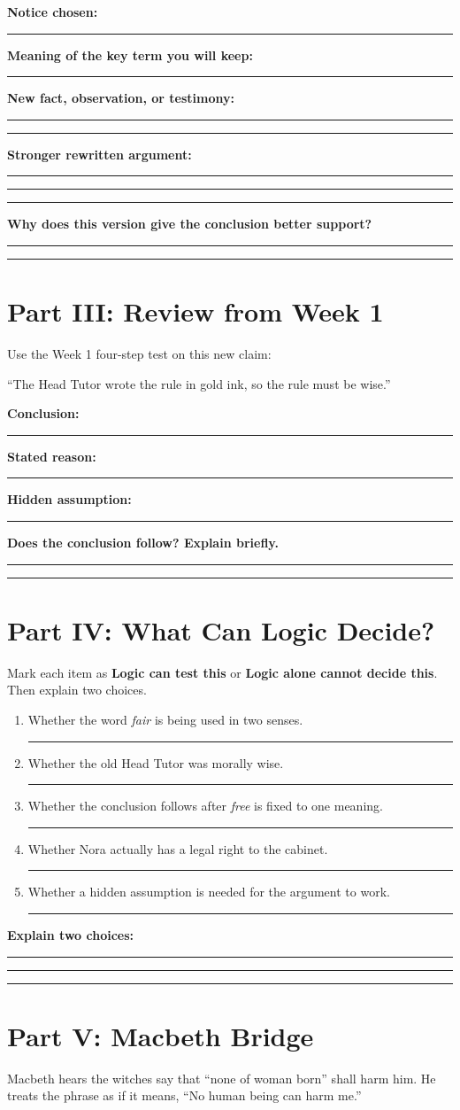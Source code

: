 \documentclass[12pt]{article}
\newcommand{\focusbox}[1]{\par\vspace{0.35em}\noindent\begingroup\setlength{\fboxsep}{6pt}\colorbox{gray!12}{\begin{minipage}{\dimexpr\linewidth-2\fboxsep\relax}#1\end{minipage}}\endgroup\par\vspace{0.45em}}
\newcommand{\studentline}{\par\vspace{0.60em}\hrule\vspace{0.64em}}
\newcommand{\shortline}{\par\vspace{0.38em}\hrule\vspace{0.48em}}
\begin{document}
\textbf{Notice chosen:} \rule{1.8in}{0.4pt}

\textbf{Meaning of the key term you will keep:}\studentline
\textbf{New fact, observation, or testimony:}\studentline\studentline
\textbf{Stronger rewritten argument:}\studentline\studentline\studentline
\textbf{Why does this version give the conclusion better support?}\studentline\studentline

\Needspace{0.42\textheight}
\section*{Part III: Review from Week 1}
Use the Week 1 four-step test on this new claim:

\focusbox{``The Head Tutor wrote the rule in gold ink, so the rule must be wise.''}

\textbf{Conclusion:}\shortline
\textbf{Stated reason:}\shortline
\textbf{Hidden assumption:}\shortline
\textbf{Does the conclusion follow? Explain briefly.}\studentline\studentline

\Needspace{0.38\textheight}
\section*{Part IV: What Can Logic Decide?}
Mark each item as \textbf{Logic can test this} or \textbf{Logic alone cannot decide this}. Then explain two choices.

\begin{enumerate}[leftmargin=*]
\item Whether the word \textit{fair} is being used in two senses. \hfill \rule{2.25in}{0.4pt}
\item Whether the old Head Tutor was morally wise. \hfill \rule{2.25in}{0.4pt}
\item Whether the conclusion follows after \textit{free} is fixed to one meaning. \hfill \rule{2.25in}{0.4pt}
\item Whether Nora actually has a legal right to the cabinet. \hfill \rule{2.25in}{0.4pt}
\item Whether a hidden assumption is needed for the argument to work. \hfill \rule{2.25in}{0.4pt}
\end{enumerate}

\textbf{Explain two choices:}\studentline\studentline\studentline

\Needspace{0.46\textheight}
\section*{Part V: Macbeth Bridge}
Macbeth hears the witches say that ``none of woman born'' shall harm him. He treats the phrase as if it means, ``No human being can harm me.''
\end{document}
